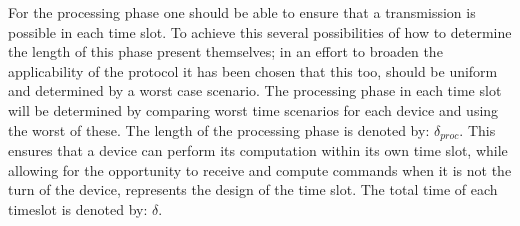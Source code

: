 \bigskip \noindent
For the processing phase one should be able to ensure that a transmission is possible in each time slot.
To achieve this several possibilities of how to determine the length of this phase present themselves; in an effort to broaden the applicability of the protocol it has been chosen that this too, should be uniform and determined by a worst case scenario.%
The processing phase in each time slot will be determined by comparing worst time scenarios for each device and using the worst of these.
The length of the processing phase is denoted by: $\delta_{proc}$.
This ensures that a device can perform its computation within its own time slot, while allowing for the opportunity to receive and compute commands when it is not the turn of the device,  represents the design of the time slot.
The total time of each timeslot is denoted by: $\delta$.

